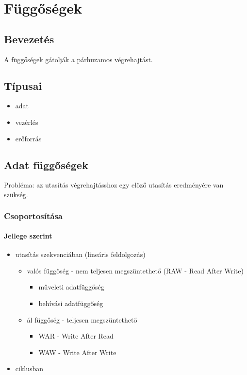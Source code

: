 
\chapter{Függőségek} \label{fuggosegek}

\section{Bevezetés}
A függőségek gátolják a párhuzamos végrehajtást.

\section{Típusai}
\begin{itemize}
    \item adat
    \item vezérlés
    \item erőforrás
\end{itemize}

\section{Adat függőségek}
Probléma: az utasítás végrehajtásshoz egy előző utasítás eredményére van szükség.

\subsection{Csoportosítása}
\subsubsection{Jellege szerint}
\begin{itemize}
    \item utasítás szekvenciában (lineáris feldolgozás)
          \begin{itemize}
              \item valós függőség - nem teljesen megszüntethető (RAW - Read After Write)
                    \begin{itemize}
                        \item műveleti adatfüggőség
                        \item behívási adatfüggőség
                    \end{itemize}
              \item ál függőség - teljesen megszüntethető
                    \begin{itemize}
                        \item WAR - Write After Read
                        \item WAW - Write After Write
                    \end{itemize}
          \end{itemize}
    \item ciklusban
\end{itemize}
